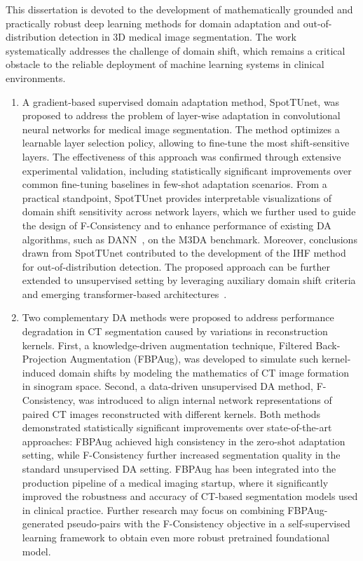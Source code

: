 This dissertation is devoted to the development of mathematically grounded and practically robust deep learning methods for domain adaptation and out-of-distribution detection in 3D medical image segmentation. The work systematically addresses the challenge of domain shift, which remains a critical obstacle to the reliable deployment of machine learning systems in clinical environments.

\begin{enumerate}
	
	\item A gradient-based supervised domain adaptation method, SpotTUnet, was proposed to address the problem of layer-wise adaptation in convolutional neural networks for medical image segmentation. The method optimizes a learnable layer selection policy, allowing to fine-tune the most shift-sensitive layers. The effectiveness of this approach was confirmed through extensive experimental validation, including statistically significant improvements over common fine-tuning baselines in few-shot adaptation scenarios. From a practical standpoint, SpotTUnet provides interpretable visualizations of domain shift sensitivity across network layers, which we further used to guide the design of F-Consistency and to enhance performance of existing DA algorithms, such as DANN~\cite{dann}, on the M3DA benchmark. Moreover, conclusions drawn from SpotTUnet contributed to the development of the IHF method for out-of-distribution detection. The proposed approach can be further extended to unsupervised setting by leveraging auxiliary domain shift criteria and emerging transformer-based architectures~\cite{unetr}.
        
    \item Two complementary DA methods were proposed to address performance degradation in CT segmentation caused by variations in reconstruction kernels. First, a knowledge-driven augmentation technique, Filtered Back-Projection Augmentation (FBPAug), was developed to simulate such kernel-induced domain shifts by modeling the mathematics of CT image formation in sinogram space. Second, a data-driven unsupervised DA method, F-Consistency, was introduced to align internal network representations of paired CT images reconstructed with different kernels. Both methods demonstrated statistically significant improvements over state-of-the-art approaches: FBPAug achieved high consistency in the zero-shot adaptation setting, while F-Consistency further increased segmentation quality in the standard unsupervised DA setting. FBPAug has been integrated into the production pipeline of a medical imaging startup, where it significantly improved the robustness and accuracy of CT-based segmentation models used in clinical practice. Further research may focus on combining FBPAug-generated pseudo-pairs with the F-Consistency objective in a self-supervised learning framework to obtain even more robust pretrained foundational model.
    

\end{enumerate}
